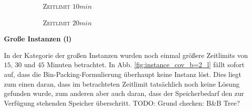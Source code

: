 \begin{figure}[H]
\begin{subfigure}[b]{0.3\textwidth}
{\begin{tabular}{ | l | l | l |}
\end{tabular}}
\caption{\textsc{Zeitlimit} $10min$}
\label{fig:res_b=2_m_b}
\end{subfigure}
\begin{subfigure}[b]{0.3\textwidth}
\centering
{}
\caption{\textsc{Zeitlimit} $20min$}
\label{fig:res_b=2_m_c}
\end{subfigure}
\caption{}
\label{fig:res_b=2_m}
\end{figure}

\pagebreak

\textbf{Große Instanzen (l)}

In der Kategorie der großen Instanzen wurden noch einmal größere Zeitlimits von $15$, $30$ und $45$
Minuten betrachtet. In Abb. \ref{fig:instance_cov_b=2_l} fällt sofort auf, dass die Bin-Packing-Formulierung überhaupt keine Instanz löst.
Dies liegt zum einen daran, dass im betrachteten Zeitlimit tatsächlich noch keine Lösung gefunden wurde,
zum anderen aber auch daran, dass der Speicherbedarf den zur Verfügung stehenden Speicher überschritt.
TODO: Grund checken: B\&B Tree?

